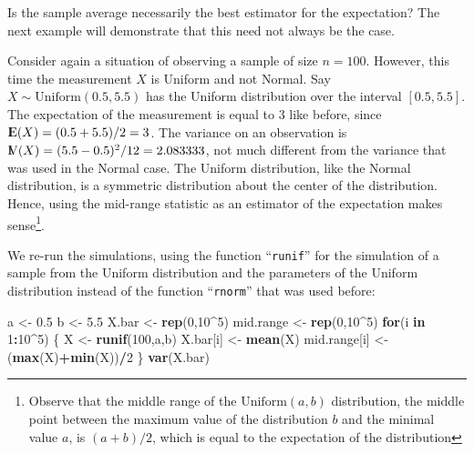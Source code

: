 \documentclass[]{krantz}
\makeatletter
\newenvironment{Shaded}{\begin{snugshade}}{\end{snugshade}}
\newcommand{\ControlFlowTok}[1]{\textcolor[rgb]{0.13,0.29,0.53}{\textbf{#1}}}
\newcommand{\DecValTok}[1]{\textcolor[rgb]{0.00,0.00,0.81}{#1}}
\newcommand{\FloatTok}[1]{\textcolor[rgb]{0.00,0.00,0.81}{#1}}
\newcommand{\KeywordTok}[1]{\textcolor[rgb]{0.13,0.29,0.53}{\textbf{#1}}}
\newcommand{\NormalTok}[1]{#1}
\newcommand{\OperatorTok}[1]{\textcolor[rgb]{0.81,0.36,0.00}{\textbf{#1}}}
\newcommand{\StringTok}[1]{\textcolor[rgb]{0.31,0.60,0.02}{#1}}
\newcommand{\Expec}{{\rm I\kern-.3em E}}
\newcommand{\Var}{{\rm I\kern-.3em V}}
\newenvironment{kframe}{%
\medskip{}
\setlength{\fboxsep}{.8em}
 \def\at@end@of@kframe{}%
 \ifinner\ifhmode%
  \def\at@end@of@kframe{\end{minipage}}%
  \begin{minipage}{\columnwidth}%
 \fi\fi%
 \def\FrameCommand##1{\hskip\@totalleftmargin \hskip-\fboxsep
 \colorbox{shadecolor}{##1}\hskip-\fboxsep
     \hskip-\linewidth \hskip-\@totalleftmargin \hskip\columnwidth}%
 \MakeFramed {\advance\hsize-\width
   \@totalleftmargin\z@ \linewidth\hsize
   \@setminipage}}%
 {\par\unskip\endMakeFramed%
 \at@end@of@kframe}
\renewenvironment{Shaded}{\begin{kframe}}{\end{kframe}}
\theoremstyle{definition}
\theoremstyle{definition}
\theoremstyle{definition}
\theoremstyle{remark}
\makeatother
\begin{document}
Is the sample average necessarily the best estimator for the
expectation? The next example will demonstrate that this need not always
be the case.

Consider again a situation of observing a sample of size \(n=100\).
However, this time the measurement \(X\) is Uniform and not Normal. Say
\(X \sim \mathrm{Uniform}(0.5,5.5)\) has the Uniform distribution over the
interval \([0.5, 5.5]\). The expectation of the measurement is equal to 3
like before, since \(\Expec(X) = (0.5+5.5)/2 = 3\). The variance on an
observation is \(\Var(X) = (5.5 - 0.5)^2/12 = 2.083333\), not much
different from the variance that was used in the Normal case. The
Uniform distribution, like the Normal distribution, is a symmetric
distribution about the center of the distribution. Hence, using the
mid-range statistic as an estimator of the expectation makes sense\footnote{Observe that the middle range of the \(\mathrm{Uniform}(a,b)\)
  distribution, the middle point between the maximum value of the
  distribution \(b\) and the minimal value \(a\), is \((a+b)/2\), which is
  equal to the expectation of the distribution}.

We re-run the simulations, using the function ``\texttt{runif}'' for the
simulation of a sample from the Uniform distribution and the parameters
of the Uniform distribution instead of the function ``\texttt{rnorm}'' that was
used before:

\begin{Shaded}
\begin{Highlighting}[]
\NormalTok{a <-}\StringTok{ }\FloatTok{0.5}
\NormalTok{b <-}\StringTok{ }\FloatTok{5.5}
\NormalTok{X.bar <-}\StringTok{ }\KeywordTok{rep}\NormalTok{(}\DecValTok{0}\NormalTok{,}\DecValTok{10}\OperatorTok{^}\DecValTok{5}\NormalTok{)}
\NormalTok{mid.range <-}\StringTok{ }\KeywordTok{rep}\NormalTok{(}\DecValTok{0}\NormalTok{,}\DecValTok{10}\OperatorTok{^}\DecValTok{5}\NormalTok{)}
\ControlFlowTok{for}\NormalTok{(i }\ControlFlowTok{in} \DecValTok{1}\OperatorTok{:}\DecValTok{10}\OperatorTok{^}\DecValTok{5}\NormalTok{) \{}
\NormalTok{  X <-}\StringTok{ }\KeywordTok{runif}\NormalTok{(}\DecValTok{100}\NormalTok{,a,b)}
\NormalTok{  X.bar[i] <-}\StringTok{ }\KeywordTok{mean}\NormalTok{(X)}
\NormalTok{  mid.range[i] <-}\StringTok{ }\NormalTok{(}\KeywordTok{max}\NormalTok{(X)}\OperatorTok{+}\KeywordTok{min}\NormalTok{(X))}\OperatorTok{/}\DecValTok{2}
\NormalTok{\}}
\KeywordTok{var}\NormalTok{(X.bar)}
\end{Highlighting}
\end{Shaded}
\end{document}
